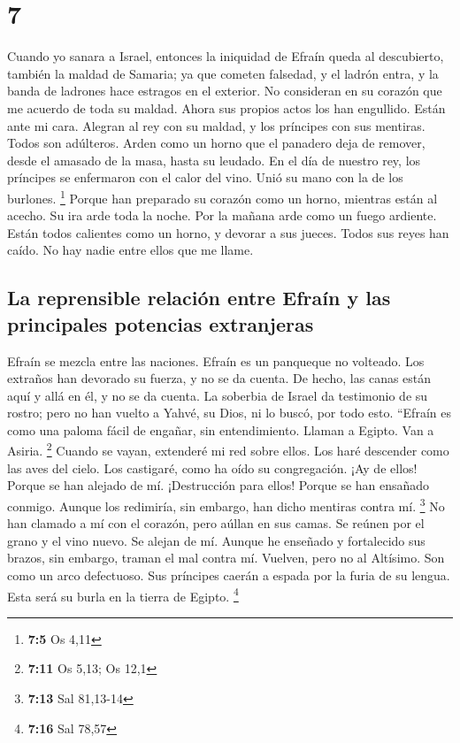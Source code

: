 \hypertarget{section-6}{%
\section{7}\label{section-6}}

 Cuando yo sanara a Israel, entonces la iniquidad de
Efraín queda al descubierto, también la maldad de Samaria; ya que
cometen falsedad, y el ladrón entra, y la banda de ladrones hace
estragos en el exterior.  No consideran en su corazón que
me acuerdo de toda su maldad. Ahora sus propios actos los han engullido.
Están ante mi cara.  Alegran al rey con su maldad, y los
príncipes con sus mentiras.  Todos son adúlteros. Arden
como un horno que el panadero deja de remover, desde el amasado de la
masa, hasta su leudado.  En el día de nuestro rey, los
príncipes se enfermaron con el calor del vino. Unió su mano con la de
los burlones. \footnote{\textbf{7:5} Os 4,11}  Porque han
preparado su corazón como un horno, mientras están al acecho. Su ira
arde toda la noche. Por la mañana arde como un fuego ardiente.
 Están todos calientes como un horno, y devorar a sus
jueces. Todos sus reyes han caído. No hay nadie entre ellos que me
llame.

\hypertarget{la-reprensible-relaciuxf3n-entre-efrauxedn-y-las-principales-potencias-extranjeras}{%
\subsection{La reprensible relación entre Efraín y las principales
potencias
extranjeras}\label{la-reprensible-relaciuxf3n-entre-efrauxedn-y-las-principales-potencias-extranjeras}}

 Efraín se mezcla entre las naciones. Efraín es un
panqueque no volteado.  Los extraños han devorado su
fuerza, y no se da cuenta. De hecho, las canas están aquí y allá en él,
y no se da cuenta.  La soberbia de Israel da testimonio
de su rostro; pero no han vuelto a Yahvé, su Dios, ni lo buscó, por todo
esto.  ``Efraín es como una paloma fácil de engañar, sin
entendimiento. Llaman a Egipto. Van a Asiria. \footnote{\textbf{7:11} Os
  5,13; Os 12,1}  Cuando se vayan, extenderé mi red sobre
ellos. Los haré descender como las aves del cielo. Los castigaré, como
ha oído su congregación.  ¡Ay de ellos! Porque se han
alejado de mí. ¡Destrucción para ellos! Porque se han ensañado conmigo.
Aunque los redimiría, sin embargo, han dicho mentiras contra mí.
\footnote{\textbf{7:13} Sal 81,13-14}  No han clamado a
mí con el corazón, pero aúllan en sus camas. Se reúnen por el grano y el
vino nuevo. Se alejan de mí.  Aunque he enseñado y
fortalecido sus brazos, sin embargo, traman el mal contra mí.
 Vuelven, pero no al Altísimo. Son como un arco
defectuoso. Sus príncipes caerán a espada por la furia de su lengua.
Esta será su burla en la tierra de Egipto. \footnote{\textbf{7:16} Sal
  78,57}

